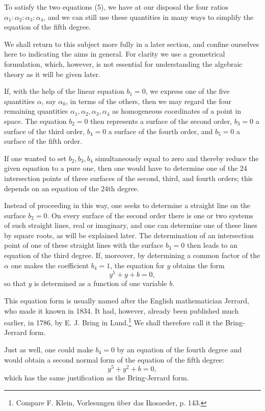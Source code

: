 \documentclass[11pt]{article}
\begin{document}
To satisfy the two equations (5), we have at our disposal the four ratios $\alpha_1:\alpha_2:\alpha_3:\alpha_4$, and we can still use these quantities in many ways to simplify the equation of the fifth degree.

We shall return to this subject more fully in a later section, and confine ourselves here to indicating the aims in general. For clarity we use a geometrical formulation, which, however, is not essential for understanding the algebraic theory as it will be given later.

If, with the help of the linear equation $b_1=0$, we express one of the five quantities $\alpha$, say $\alpha_0$, in terms of the others, then we may regard the four remaining quantities $\alpha_1,\alpha_2,\alpha_3,\alpha_4$ as homogeneous coordinates of a point in space. The equation $b_2=0$ then represents a surface of the second order, $b_3=0$ a surface of the third order, $b_4=0$ a surface of the fourth order, and $b_5=0$ a surface of the fifth order.

If one wanted to set $b_2,b_3,b_4$ simultaneously equal to zero and thereby reduce the given equation to a pure one, then one would have to determine one of the 24 intersection points of three surfaces of the second, third, and fourth orders; this depends on an equation of the 24th degree.

Instead of proceeding in this way, one seeks to determine a straight line on the surface $b_2=0$. On every surface of the second order there is one or two systems of such straight lines, real or imaginary, and one can determine one of these lines by square roots, as will be explained later. The determination of an intersection point of one of these straight lines with the surface $b_3=0$ then leads to an equation of the third degree. If, moreover, by determining a common factor of the $\alpha$ one makes the coefficient $b_4=1$, the equation for $y$ obtains the form
\begin{equation}
y^5+y+b=0,
\tag{6}
\end{equation}
so that $y$ is determined as a function of one variable $b$.

This equation form is usually named after the English mathematician Jerrard, who made it known in 1834. It had, however, already been published much earlier, in 1786, by E. J. Bring in Lund.\footnote{Compare F. Klein, Vorlesungen über das Ikosaeder, p. 143.} We shall therefore call it the Bring-Jerrard form.

Just as well, one could make $b_4=0$ by an equation of the fourth degree and would obtain a second normal form of the equation of the fifth degree:
\begin{equation}
y^5+y^2+b=0,
\tag{7}
\end{equation}
which has the same justification as the Bring-Jerrard form.
\end{document}
